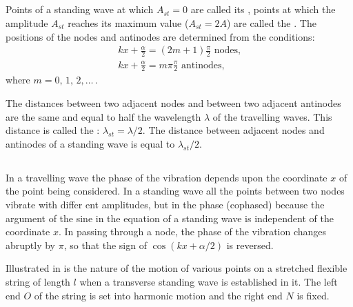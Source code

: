 \subsection{}\label{30.5.5} Points of a standing wave at which $A_{st} = 0$ are called its , points at which the amplitude $A_{st}$ reaches its maximum value ($A_{st} = 2A$) are called the . The positions of the nodes and antinodes are determined from the conditions:
\begin{align*}%
kx + \frac{\alpha}{2} = (2m + 1) \frac{\pi}{2} \,\, \text{nodes,}\\
kx + \frac{\alpha}{2} = m \pi \frac{\pi}{2} \,\, \text{antinodes,}
\end{align*}
where $m = 0,\,1,\,2,\ldots{\,}$.

The distances between two adjacent nodes and between two adjacent antinodes are the same and equal to half the wavelength  $\lambda$ of the travelling waves. This distance is called the : $\lambda_{st} = \lambda/2$. The distance between adjacent nodes and antinodes of a standing wave is equal to $\lambda_{st}/2$.

\subsection{}\label{30.5.6} In a travelling wave the phase of the vibration depends upon the coordinate $x$ of the point being considered. In a standing wave all the points between two nodes vibrate with differ­ ent amplitudes, but in the  phase (cophased) because the argument of the sine in the equation of a standing wave  is independent of the coordinate $x$. In passing through a node, the phase of the vibration changes abruptly by $\pi$, so that the sign of $\cos (kx + \alpha/2)$ is reversed.

Illustrated in  is the nature of the motion of various points on a stretched flexible string of length $l$ when a transverse standing wave is established in it. The left end $O$ of the string is set into harmonic motion and the right end $N$ is fixed.

